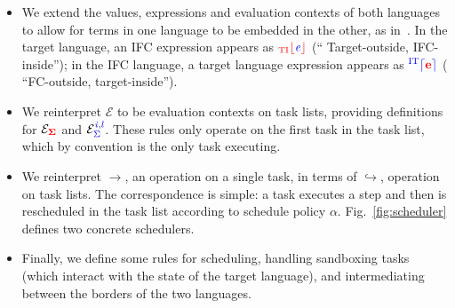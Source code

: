 \documentclass{llncs}
\newcommand{\Varid}[1]{\mathit{#1}}
\newcommand{\Red}[1]{{\color{red} #1}}
\begin{document}
\begin{itemize}
    \item We extend the values, expressions and evaluation contexts of
      both languages to allow for terms in one language to
      be embedded in the other, as
      in~\cite{Matthews:2007:OSM:1190216.1190220}.
In the target language, an IFC expression appears as \ensuremath{\tar{_{\textrm{TI}}\lfloor}\ifc{\Varid{e}}\tar{\rfloor}} (``\Red{T}arget-outside,
IFC-inside''); in the IFC language, a target language expression appears as \ensuremath{\ifc{^{\textrm{IT}}\lceil}\tar{e}\ifc{\rceil}} ( ``{\color{blue}{I}}FC-outside, target-inside'').
    \item We reinterpret \ensuremath{\mathcal{E}} to be evaluation contexts on task lists, providing definitions for \ensuremath{\mathcal{E}_{\tar{\Sigma}}} and \ensuremath{\mathcal{E}_{\ifc{\Sigma}}^{\ifc{\Varid{i}},\ifc{l}}}.  These rules only operate on the first task in the task list, which by convention is the only task executing.
    \item We reinterpret \ensuremath{\rightarrow}, an operation on a single task, in terms of \ensuremath{\hookrightarrow}, operation on task lists.  The correspondence is simple: a task executes a step and then is rescheduled in the task list according to schedule policy \ensuremath{\alpha}.
    Fig.~\ref{fig:scheduler} defines two concrete schedulers.
    \item Finally, we define some rules for scheduling, handling sandboxing tasks (which interact with the state of the target language),
    and intermediating between the borders of the two languages.
\end{itemize}
\end{document}

